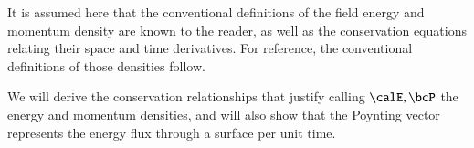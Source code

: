 %
%

It is assumed here that the conventional definitions of the field energy and momentum density are known to the reader, as well as the
conservation equations relating their space and time derivatives.  For reference, the conventional definitions of those densities follow.

We will derive the conservation relationships that justify calling \( \calE, \bcP \) the energy and momentum densities, and will also show that the
Poynting vector represents the energy flux through a surface per unit time.

